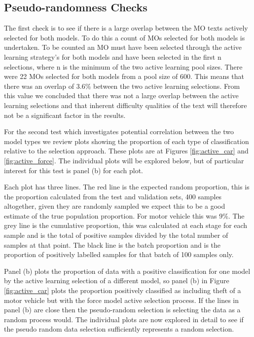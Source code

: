\subsection{Pseudo-randomness Checks}

The first check is to see if there is a large overlap between the MO texts actively selected for both models. To do this a count of MOs selected for both models is undertaken. To be counted an MO must have been selected through the active learning strategy's for both models and have been selected in the first n selections, where n is the minimum of the two active learning pool sizes. There were 22 MOs selected for both models from a pool size of 600. This means that there was an overlap of 3.6\% between the two active learning selections. From this value we concluded that there was not a large overlap between the active learning selections and that inherent difficulty qualities of the text will therefore not be a significant factor in the results.  

For the second test which investigates potential correlation between the two model types we review plots showing the proportion of each type of classification relative to the selection approach. These plots are at Figures \ref{fig:active_car} and \ref{fig:active_force}. The individual plots will be explored below, but of particular interest for this test is panel (b) for each plot. 

Each plot has three lines. The red line is the expected random proportion, this is the proportion calculated from the test and validation sets, 400 samples altogether, given they are randomly sampled we expect this to be a good estimate of the true population proportion. For motor vehicle this was 9\%. The grey line is the cumulative proportion, this was calculated at each stage for each sample and is the total of positive samples divided by the total number of samples at that point. The black line is the batch proportion and is the proportion of positively labelled samples for that batch of 100 samples only. 

Panel (b) plots the proportion of data with a positive classification for one model by the active learning selection of a different model, so panel (b) in Figure \ref{fig:active_car} plots the proportion positively classified as including theft of a motor vehicle but with the force model active selection process. If the lines in panel (b) are close then the pseudo-random selection is selecting the data as a random process would. The individual plots are now explored in detail to see if the pseudo random data selection sufficiently represents a random selection. 


